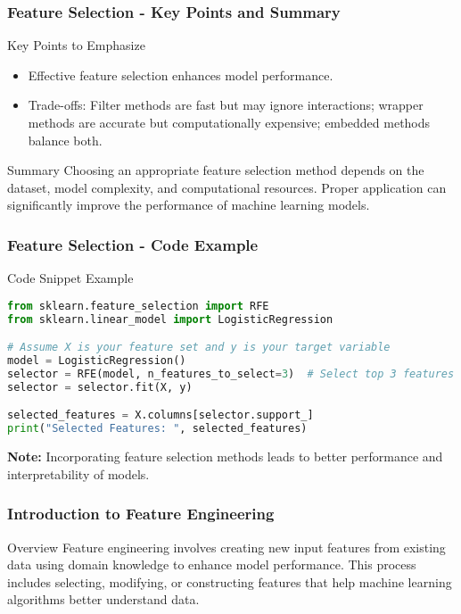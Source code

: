 \documentclass[aspectratio=169]{beamer}
\begin{document}
\begin{frame}[fragile]
    \frametitle{Feature Selection - Key Points and Summary}
    \begin{block}{Key Points to Emphasize}
        \begin{itemize}
            \item Effective feature selection enhances model performance.
            \item Trade-offs: Filter methods are fast but may ignore interactions; wrapper methods are accurate but computationally expensive; embedded methods balance both.
        \end{itemize}
    \end{block}
    
    \begin{block}{Summary}
        Choosing an appropriate feature selection method depends on the dataset, model complexity, and computational resources. Proper application can significantly improve the performance of machine learning models.
    \end{block}
\end{frame}

\begin{frame}[fragile]
    \frametitle{Feature Selection - Code Example}
    \begin{block}{Code Snippet Example}
        \begin{lstlisting}[language=Python]
from sklearn.feature_selection import RFE
from sklearn.linear_model import LogisticRegression

# Assume X is your feature set and y is your target variable
model = LogisticRegression()
selector = RFE(model, n_features_to_select=3)  # Select top 3 features
selector = selector.fit(X, y)

selected_features = X.columns[selector.support_]
print("Selected Features: ", selected_features)
        \end{lstlisting}
    \end{block}
    \textbf{Note:} Incorporating feature selection methods leads to better performance and interpretability of models.
\end{frame}

\begin{frame}[fragile]
    \frametitle{Introduction to Feature Engineering}
    \begin{block}{Overview}
        Feature engineering involves creating new input features from existing data using domain knowledge to enhance model performance. This process includes selecting, modifying, or constructing features that help machine learning algorithms better understand data.
    \end{block}
\end{frame}
\end{document}

